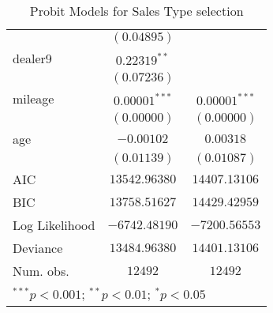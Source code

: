 \begin{table}
\begin{center}
\begin{tabular}{l c c}
                 & $(0.04895)$      &                  \\
dealer9          & $0.22319^{**}$   &                  \\
                 & $(0.07236)$      &                  \\
mileage          & $0.00001^{***}$  & $0.00001^{***}$  \\
                 & $(0.00000)$      & $(0.00000)$      \\
age              & $-0.00102$       & $0.00318$        \\
                 & $(0.01139)$      & $(0.01087)$      \\
\hline
AIC              & $13542.96380$    & $14407.13106$    \\
BIC              & $13758.51627$    & $14429.42959$    \\
Log Likelihood   & $-6742.48190$    & $-7200.56553$    \\
Deviance         & $13484.96380$    & $14401.13106$    \\
Num. obs.        & $12492$          & $12492$          \\
\hline
\multicolumn{3}{l}{\scriptsize{$^{***}p<0.001$; $^{**}p<0.01$; $^{*}p<0.05$}}
\end{tabular}
\caption{Probit Models for Sales Type selection}
\label{tab:reg_probit}
\end{center}
\end{table}
